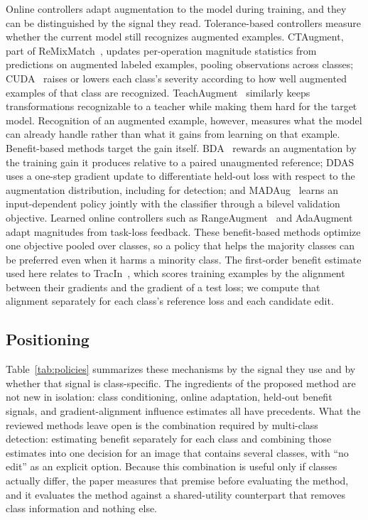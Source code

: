 \documentclass[conference]{IEEEtran}
\begin{document}
Online controllers adapt augmentation to the model during training, and they can be distinguished by the signal they read. Tolerance-based controllers measure whether the current model still recognizes augmented examples. CTAugment, part of ReMixMatch~\cite{berthelot2020}, updates per-operation magnitude statistics from predictions on augmented labeled examples, pooling observations across classes; CUDA~\cite{ahn2023cuda} raises or lowers each class's severity according to how well augmented examples of that class are recognized. TeachAugment~\cite{suzuki2022teach} similarly keeps transformations recognizable to a teacher while making them hard for the target model. Recognition of an augmented example, however, measures what the model can already handle rather than what it gains from learning on that example. Benefit-based methods target the gain itself. BDA~\cite{lu2023bda} rewards an augmentation by the training gain it produces relative to a paired unaugmented reference; DDAS~\cite{liu2021ddas} uses a one-step gradient update to differentiate held-out loss with respect to the augmentation distribution, including for detection; and MADAug~\cite{hou2023madaug} learns an input-dependent policy jointly with the classifier through a bilevel validation objective. Learned online controllers such as RangeAugment~\cite{mehta2022rangeaugment} and AdaAugment~\cite{yang2025adaaugment} adapt magnitudes from task-loss feedback. These benefit-based methods optimize one objective pooled over classes, so a policy that helps the majority classes can be preferred even when it harms a minority class. The first-order benefit estimate used here relates to TracIn~\cite{pruthi2020tracin}, which scores training examples by the alignment between their gradients and the gradient of a test loss; we compute that alignment separately for each class's reference loss and each candidate edit.

\subsection{Positioning}

Table~\ref{tab:policies} summarizes these mechanisms by the signal they use and by whether that signal is class-specific. The ingredients of the proposed method are not new in isolation: class conditioning, online adaptation, held-out benefit signals, and gradient-alignment influence estimates all have precedents. What the reviewed methods leave open is the combination required by multi-class detection: estimating benefit separately for each class and combining those estimates into one decision for an image that contains several classes, with ``no edit'' as an explicit option. Because this combination is useful only if classes actually differ, the paper measures that premise before evaluating the method, and it evaluates the method against a shared-utility counterpart that removes class information and nothing else.
\end{document}
